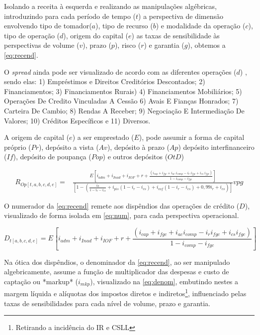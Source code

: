 \documentclass[
  12pt,
  12pt,
  openright,
  oneside,
  a4paper,
  chapter=TITLE,
  section=TITLE,
  subsection=TITLE,
  subsubsection=TITLE,
  portugues,
  sumario=tradicional]{abntex2}
\begin{document}
\begin{apendicesenv}
Isolando a receita à esquerda e realizando as manipulações algébricas, introduzindo para cada período de tempo ($t$) a perspectiva de dimensão envolvendo tipo de tomador($a$), tipo de recurso ($b$) e modalidade da operação ($c$), tipo de operação ($d$), origem do capital ($e$) as taxas de sensibilidade às perspectivas de volume ($v$), prazo ($p$), risco ($r$) e garantia ($g$), obtemos a \autoref{eq:recend}.

O \emph{spread} ainda pode ser visualizado de acordo com as diferentes operações ($d$) , sendo elas: 1) Empréstimos e Direitos Creditórios Descontados; 2) Financiamentos; 3) Financiamentos Rurais) 4) Financiamentos Mobiliários; 5) Operações De Credito Vinculadas A Cessão 6) Avais E Fianças Honrados; 7) Carteira De Cambio; 8) Rendas A Receber; 9) Negociação E Intermediação De Valores; 10) Créditos Específicos e 11) Diversos.

A origem de capital ($e$) a ser emprestado ($E$), pode assumir a forma de capital próprio ($Pr$), depósito a vista ($Av$), depósito à prazo ($Ap$) depósito interfinanceiro ($If$), depósito de poupança ($Pop$) e outros depósitos ($OtD$)



\begin{equation}\label{eq:recend}
\begin{aligned}
R_{Op[t,a,b,c,d,e]} = & \frac{E_{} \left[ i_{adm} + i_{Inad} + i_{IOF} + r +  \frac{(i_{cap} + i_{fgc} + i_{ac}.i_{comp} - i_{r}.i_{fgc}+ i_{cs}.i_{fgc})}{1 - i_{comp} - i_{fgc}} \right]}
{\left[ 1 - (\frac{i_{ll}}{1 - i_{r} - i_{cs}} + i_{pis}(1 - i_{r} - i_{cs}) + i_{cof}(1 - i_{r} - i_{cs}) + 0,99i_{r} + i_{cs})\right]}vpg
\end{aligned}
\end{equation}



O numerador da \autoref{eq:recend} remete aos dispêndios das operações de crédito ($D$), visualizado de forma isolada em \autoref{eq:num}, para cada perspectiva operacional.


\begin{equation}\label{eq:num}
D_{t[a,b,c,d,e]} = E_{} \left[ i_{adm} + i_{Inad} + i_{IOF} + r +  \frac{(i_{cap} + i_{fgc} + i_{ac}i_{comp} - i_{r}i_{fgc}+ i_{cs}i_{fgc})}{1 - i_{comp} - i_{fgc}} \right]
\end{equation}



Na ótica dos dispêndios, o denominador da \autoref{eq:recend}, ao ser manipulado algebricamente, assume a função de multiplicador das despesas e custo de captação ou *markup* ($i_{mkp}$), visualizado na \autoref{eq:denom}, embutindo nestes a margem líquida e alíquotas dos impostos diretos e indiretos\footnote{Retirando a incidência do IR e CSLL}, influenciado pelas taxas de sensibilidades para cada nível de volume, prazo e garantia. 




\end{apendicesenv}
\end{document}
